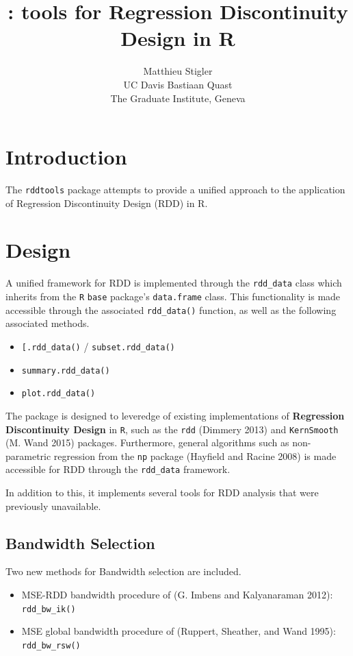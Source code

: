 \documentclass[article]{jss}
\author{
Matthieu Stigler\\UC Davis \And Bastiaan Quast\\The Graduate Institute, Geneva
}
\title{\pkg{rddtools}: tools for Regression Discontinuity Design in R}
\begin{document}
\section{Introduction}\label{introduction}

The \texttt{rddtools} package attempts to provide a unified approach to
the application of Regression Discontinuity Design (RDD) in R.

\section{Design}\label{design}

A unified framework for RDD is implemented through the
\texttt{rdd\_data} class which inherits from the \texttt{R}
\texttt{base} package's \texttt{data.frame} class. This functionality is
made accessible through the associated \texttt{rdd\_data()} function, as
well as the following associated methods.

\begin{itemize}
\itemsep1pt\parskip0pt
\item
  \texttt{{[}.rdd\_data()} / \texttt{subset.rdd\_data()}
\item
  \texttt{summary.rdd\_data()}
\item
  \texttt{plot.rdd\_data()}
\end{itemize}

The package is designed to leveredge of existing implementations of
\textbf{Regression Discontinuity Design} in \texttt{R}, such as the
\texttt{rdd} (Dimmery 2013) and \texttt{KernSmooth} (M. Wand 2015)
packages. Furthermore, general algorithms such as non-parametric
regression from the \texttt{np} package (Hayfield and Racine 2008) is
made accessible for RDD through the \texttt{rdd\_data} framework.

In addition to this, it implements several tools for RDD analysis that
were previously unavailable.

\subsection{Bandwidth Selection}\label{bandwidth-selection}

Two new methods for Bandwidth selection are included.

\begin{itemize}
\itemsep1pt\parskip0pt
\item
  MSE-RDD bandwidth procedure of (G. Imbens and Kalyanaraman 2012):
  \texttt{rdd\_bw\_ik()}
\item
  MSE global bandwidth procedure of (Ruppert, Sheather, and Wand 1995):
  \texttt{rdd\_bw\_rsw()}
\end{itemize}
\end{document}
